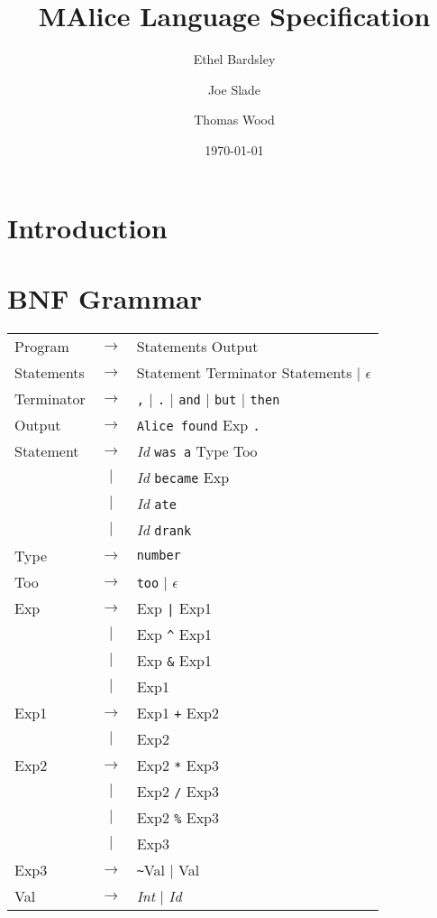 \documentclass[a4wide, 11pt]{article}
\begin{document}
\title{MAlice Language Specification}

\author{Ethel Bardsley \and Joe Slade \and Thomas Wood}

\date{\today}         %

\maketitle            %

\section{Introduction}

\section{BNF Grammar} 
\begin{tabular}{lcl}
Program     & $\to$ & Statements Output \\
Statements  & $\to$ & Statement Terminator Statements $|$ $\epsilon$ \\
Terminator  & $\to$ & \verb:,: $|$ \verb:.: $|$ \verb:and: $|$ \verb:but: $|$ \verb:then: \\
Output      & $\to$ & \verb:Alice found: Exp \verb:.: \\
Statement   & $\to$ & \emph{Id} \verb|was a| Type Too \\
            &  $|$  & \emph{Id} \verb|became| Exp \\
            &  $|$  & \emph{Id} \verb|ate| \\
            &  $|$  & \emph{Id} \verb|drank| \\
Type        & $\to$ & \verb|number| \\
Too         & $\to$ & \verb|too| $|$ $\epsilon$ \\
Exp         & $\to$ & Exp \verb:|: Exp1 \\
            &  $|$  & Exp \verb:^: Exp1 \\
            &  $|$  & Exp \verb:&: Exp1 \\
            &  $|$  & Exp1 \\
Exp1        & $\to$ & Exp1 \verb:+: Exp2 \\
            &  $|$  & Exp2 \\
Exp2        & $\to$ & Exp2 \verb:*: Exp3 \\
            &  $|$  & Exp2 \verb:/: Exp3 \\
            &  $|$  & Exp2 \verb:%: Exp3 \\
            &  $|$  & Exp3 \\
Exp3        & $\to$ & \verb:~:Val $|$ Val \\
Val         & $\to$ & \emph{Int} $|$ \emph{Id} \\
\end{tabular}
\end{document}

